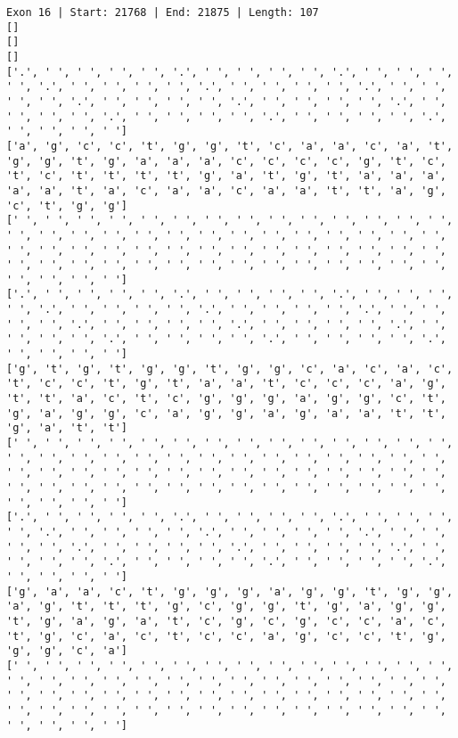 \documentclass{article}
\begin{document}
\begin{Verbatim}
Exon 16 | Start: 21768 | End: 21875 | Length: 107
[]
[]
[]
['.', ' ', ' ', ' ', ' ', '.', ' ', ' ', ' ', ' ', '.', ' ', ' ', ' ', ' ', '.', ' ', ' ', ' ', ' ', '.', ' ', ' ', ' ', ' ', '.', ' ', ' ', ' ', ' ', '.', ' ', ' ', ' ', ' ', '.', ' ', ' ', ' ', ' ', '.', ' ', ' ', ' ', ' ', '.', ' ', ' ', ' ', ' ', '.', ' ', ' ', ' ', ' ', '.', ' ', ' ', ' ', ' ']
['a', 'g', 'c', 'c', 't', 'g', 'g', 't', 'c', 'a', 'a', 'c', 'a', 't', 'g', 'g', 't', 'g', 'a', 'a', 'a', 'c', 'c', 'c', 'c', 'g', 't', 'c', 't', 'c', 't', 't', 't', 't', 'g', 'a', 't', 'g', 't', 'a', 'a', 'a', 'a', 'a', 't', 'a', 'c', 'a', 'a', 'c', 'a', 'a', 't', 't', 'a', 'g', 'c', 't', 'g', 'g']
[' ', ' ', ' ', ' ', ' ', ' ', ' ', ' ', ' ', ' ', ' ', ' ', ' ', ' ', ' ', ' ', ' ', ' ', ' ', ' ', ' ', ' ', ' ', ' ', ' ', ' ', ' ', ' ', ' ', ' ', ' ', ' ', ' ', ' ', ' ', ' ', ' ', ' ', ' ', ' ', ' ', ' ', ' ', ' ', ' ', ' ', ' ', ' ', ' ', ' ', ' ', ' ', ' ', ' ', ' ', ' ', ' ', ' ', ' ', ' ']
['.', ' ', ' ', ' ', ' ', '.', ' ', ' ', ' ', ' ', '.', ' ', ' ', ' ', ' ', '.', ' ', ' ', ' ', ' ', '.', ' ', ' ', ' ', ' ', '.', ' ', ' ', ' ', ' ', '.', ' ', ' ', ' ', ' ', '.', ' ', ' ', ' ', ' ', '.', ' ', ' ', ' ', ' ', '.', ' ', ' ', ' ', ' ', '.', ' ', ' ', ' ', ' ', '.', ' ', ' ', ' ', ' ']
['g', 't', 'g', 't', 'g', 'g', 't', 'g', 'g', 'c', 'a', 'c', 'a', 'c', 't', 'c', 'c', 't', 'g', 't', 'a', 'a', 't', 'c', 'c', 'c', 'a', 'g', 't', 't', 'a', 'c', 't', 'c', 'g', 'g', 'g', 'a', 'g', 'g', 'c', 't', 'g', 'a', 'g', 'g', 'c', 'a', 'g', 'g', 'a', 'g', 'a', 'a', 't', 't', 'g', 'a', 't', 't']
[' ', ' ', ' ', ' ', ' ', ' ', ' ', ' ', ' ', ' ', ' ', ' ', ' ', ' ', ' ', ' ', ' ', ' ', ' ', ' ', ' ', ' ', ' ', ' ', ' ', ' ', ' ', ' ', ' ', ' ', ' ', ' ', ' ', ' ', ' ', ' ', ' ', ' ', ' ', ' ', ' ', ' ', ' ', ' ', ' ', ' ', ' ', ' ', ' ', ' ', ' ', ' ', ' ', ' ', ' ', ' ', ' ', ' ', ' ', ' ']
['.', ' ', ' ', ' ', ' ', '.', ' ', ' ', ' ', ' ', '.', ' ', ' ', ' ', ' ', '.', ' ', ' ', ' ', ' ', '.', ' ', ' ', ' ', ' ', '.', ' ', ' ', ' ', ' ', '.', ' ', ' ', ' ', ' ', '.', ' ', ' ', ' ', ' ', '.', ' ', ' ', ' ', ' ', '.', ' ', ' ', ' ', ' ', '.', ' ', ' ', ' ', ' ', '.', ' ', ' ', ' ', ' ']
['g', 'a', 'a', 'c', 't', 'g', 'g', 'g', 'a', 'g', 'g', 't', 'g', 'g', 'a', 'g', 't', 't', 't', 'g', 'c', 'g', 'g', 't', 'g', 'a', 'g', 'g', 't', 'g', 'a', 'g', 'a', 't', 'c', 'g', 'c', 'g', 'c', 'c', 'a', 'c', 't', 'g', 'c', 'a', 'c', 't', 'c', 'c', 'a', 'g', 'c', 'c', 't', 'g', 'g', 'g', 'c', 'a']
[' ', ' ', ' ', ' ', ' ', ' ', ' ', ' ', ' ', ' ', ' ', ' ', ' ', ' ', ' ', ' ', ' ', ' ', ' ', ' ', ' ', ' ', ' ', ' ', ' ', ' ', ' ', ' ', ' ', ' ', ' ', ' ', ' ', ' ', ' ', ' ', ' ', ' ', ' ', ' ', ' ', ' ', ' ', ' ', ' ', ' ', ' ', ' ', ' ', ' ', ' ', ' ', ' ', ' ', ' ', ' ', ' ', ' ', ' ', ' ']

\end{Verbatim}
\end{document}
